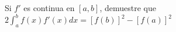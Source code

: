 \item Si $f'$ es continua en $[a, b]$, demuestre que $\displaystyle 2 \int_a^b f(x) f'(x) dx = [f(b)]^2 - [f(a)]^2$
